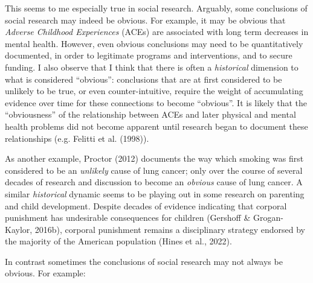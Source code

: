 \documentclass[
  letterpaper,
  DIV=11,
  numbers=noendperiod]{scrreprt}
\begin{document}
This seems to me especially true in social research. Arguably, some
conclusions of social research may indeed be obvious. For example, it
may be obvious that \emph{Adverse Childhood Experiences} (ACEs) are
associated with long term decreases in mental health. However, even
obvious conclusions may need to be quantitatively documented, in order
to legitimate programs and interventions, and to secure funding. I also
observe that I think that there is often a \emph{historical} dimension
to what is considered ``obvious'': conclusions that are at first
considered to be unlikely to be true, or even counter-intuitive, require
the weight of accumulating evidence over time for these connections to
become ``obvious''. It is likely that the ``obviousness'' of the
relationship between ACEs and later physical and mental health problems
did not become apparent until research began to document these
relationships (e.g. Felitti et al. (1998)).

As another example, Proctor (2012) documents the way which smoking was
first considered to be an \emph{unlikely} cause of lung cancer; only
over the course of several decades of research and discussion to become
an \emph{obvious} cause of lung cancer. A similar \emph{historical}
dynamic seems to be playing out in some research on parenting and child
development. Despite decades of evidence indicating that corporal
punishment has undesirable consequences for children (Gershoff \&
Grogan-Kaylor, 2016b), corporal punishment remains a disciplinary
strategy endorsed by the majority of the American population (Hines et
al., 2022).

In contrast sometimes the conclusions of social research may not always
be obvious. For example:
\end{document}
